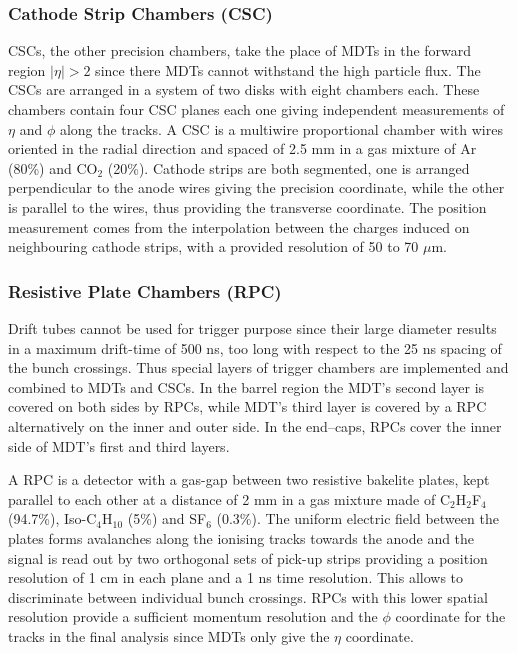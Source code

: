 \subsubsection{Cathode Strip Chambers (CSC)}
CSCs, the other precision chambers, take the place of MDTs in the forward region $|\eta|>2$ since there MDTs cannot withstand the high particle flux. The CSCs are arranged in a system of two disks with eight chambers each. These chambers contain four CSC planes each one giving independent measurements of $\eta$ and $\phi$ along the tracks. A CSC is a multiwire proportional chamber with wires oriented in the radial direction and spaced of 2.5 mm in a gas mixture of Ar (80\%) and CO$_{2}$ (20\%). Cathode strips are both segmented, one is arranged perpendicular to the anode wires giving the precision coordinate, while the other is parallel to the wires, thus providing the transverse coordinate. The position measurement comes from the interpolation between the charges induced on neighbouring cathode strips, with a provided resolution of 50 to 70 $\mu$m.

\subsubsection{Resistive Plate Chambers (RPC)}
Drift tubes cannot be used for trigger purpose since their large diameter results in a maximum drift-time of 500 ns, too long with respect to the 25 ns spacing of the bunch crossings. Thus special layers of trigger chambers are implemented and combined to MDTs and CSCs. In the barrel region the MDT's second layer is covered on both sides by RPCs, while MDT's third layer is covered by a RPC alternatively on the inner and outer side. In the end–caps, RPCs cover the inner side of MDT's first and third layers.

A RPC is a detector with a gas-gap between two resistive bakelite plates, kept parallel to each other at a distance of 2 mm in a gas mixture made of C$_{2}$H$_{2}$F$_{4}$ (94.7\%), Iso-C$_{4}$H$_{10}$ (5\%) and SF$_{6}$ (0.3\%). The uniform electric field between the plates forms avalanches along the ionising tracks towards the anode and the signal is read out by two orthogonal sets of pick-up strips providing a position resolution of 1 cm in each plane and a 1 ns time resolution. This allows to discriminate between individual bunch crossings. RPCs with this lower spatial resolution provide a sufficient momentum resolution and the $\phi$ coordinate for the tracks in the final analysis since MDTs only give the $\eta$ coordinate.

